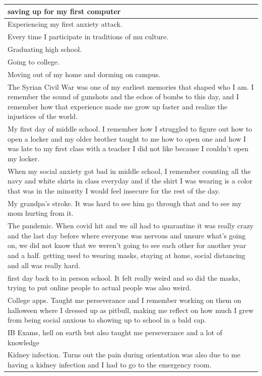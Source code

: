 \documentclass[
  .7em,
  letterpaper,
  DIV=11,
  numbers=noendperiod]{scrartcl}
\begin{document}
\begin{table}
\begin{tabular}{l}
\hline
saving up for my first computer\\
\hline
Experiencing my first anxiety attack.\\
\hline
Every time I participate in traditions of mu culture.\\
\hline
Graduating high school.\\
\hline
Going to college.\\
\hline
Moving out of my home and dorming on campus.\\
\hline
The Syrian Civil War was one of my earliest memories that shaped who I am. I remember the sound of gunshots and the echos of bombs to this day, and I remember how that experience made me grow up faster and realize the injustices of the world.\\
\hline
My first day of middle school. I remember how I struggled to figure out how to open a locker and my older brother taught to me how to open one and how I was late to my first class with a teacher I did not like because I couldn't open my locker.\\
\hline
When my social anxiety got bad in middle school, I remember counting all the navy and white shirts in class everyday and if the shirt I was wearing is a color that was in the minority I would feel insecure for the rest of the day.\\
\hline
My grandpa's stroke. It was hard to see him go through that and to see my mom hurting from it.\\
\hline
The pandemic. When covid hit and we all had to quarantine it was really crazy and the last day before where everyone was nervous and unsure what's going on, we did not know that we weren't going to see each other for another year and a half. getting used to wearing masks, staying at home, social distancing and all was really hard.\\
\hline
first day back to in person school. It felt really weird and so did the masks, trying to put online people to actual people was also weird.\\
\hline
College apps. Taught me perseverance and I remember working on them on halloween where I dressed up as pitbull, making me reflect on how much I grew from being social anxious to showing up to school in a bald cap.\\
\hline
IB Exams, hell on earth but also taught me perseverance and a lot of knowledge\\
\hline
Kidney infection. Turns out the pain during orientation was also due to me having a kidney infection and I had to go to the emergency room.\\

\end{tabular}
\end{table}
\end{document}
